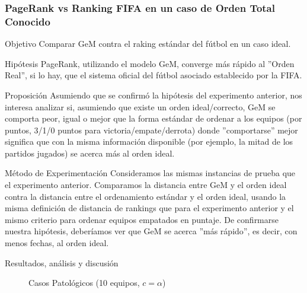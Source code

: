 \subsubsection{PageRank vs Ranking FIFA en un caso de Orden Total Conocido}
\label{subsec:exp5_aux}
\begin{LaTeXdescription}
    \item[Objetivo] Comparar GeM contra el raking est\'andar del f\'utbol en un
        caso ideal.\\

    \item[Hip\'otesis] PageRank, utilizando el modelo GeM, converge m\'as
        r\'apido al ''Orden Real'', si lo hay, que el sistema oficial del
        f\'utbol asociado establecido por la FIFA\cite{fifa}.\\

    \item[Proposici\'on] Asumiendo que se confirm\'o la hip\'otesis del
        experimento anterior, nos interesa analizar si, asumiendo que existe un
        orden ideal/correcto, GeM se comporta peor, igual o mejor que la forma
        est\'andar de ordenar a los equipos (por puntos, 3/1/0 puntos para
        victoria/empate/derrota) donde ''comportarse'' mejor significa que con
        la misma información disponible (por ejemplo, la mitad de los partidos
        jugados) se acerca m\'as al orden ideal.\\

    \item[M\'etodo de Experimentaci\'on] Consideramos las mismas instancias de
        prueba que el experimento anterior. Comparamos la distancia entre GeM y
        el orden ideal contra la distancia entre el ordenamiento est\'andar y el
        orden ideal, usando la misma definici\'on de distancia de rankings que
        para el experimento anterior y el mismo criterio para ordenar equipos
        empatados en puntaje. De confirmarse nuestra hip\'otesis, deber\'iamos
        ver que GeM se acerca ''m\'as r\'apido'', es decir, con menos fechas, al
        orden ideal.\\

    \item[Resultados, an\'alisis y discusi\'on] 
\end{LaTeXdescription}

\begin{figure}[H]
    \caption{Casos Patol\'ogicos (10 equipos, $c = \alpha$)}
    \label{fig:exp5_2}
    \centering
\end{figure}

